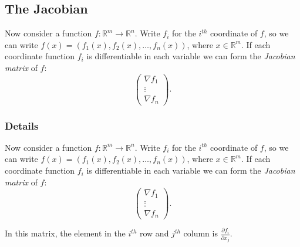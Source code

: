 \documentclass[12pt,a4paper]{article}
\theoremstyle{regla}
\theoremstyle{remark}
\theoremstyle{definition}
\theoremstyle{nonumberbreak}
\begin{document}
\subsection{The Jacobian}
\begin{fbox}
\begin{minipage}{0.97\textwidth}
Now consider a function 
$f:\mathbb{R}^m\to\mathbb{R}^n$. 
Write $f_i$ for the $i^{th}$ coordinate of $f$, so we can write $f(x)=(f_1(x),f_2(x),\ldots,f_n(x))$, 
where $x\in\mathbb{R}^m$. 
If each coordinate function $f_i$ is differentiable in each variable we can form the {\em Jacobian matrix} of $f$: 
$$\begin{pmatrix}\nabla f_1\\ 
  \vdots\\ 
  \nabla f_n
\end{pmatrix}.$$

\end{minipage}
\end{fbox}
\subsubsection{Details}
Now consider a function 
$f:\mathbb{R}^m\to\mathbb{R}^n$. 
Write $f_i$ for the $i^{th}$ coordinate of $f$, so we can write $f(x)=(f_1(x),f_2(x),\ldots,f_n(x))$, 
where $x\in\mathbb{R}^m$. 
If each coordinate function $f_i$ is differentiable in each variable we can form the {\em Jacobian matrix} of $f$: 
$$\begin{pmatrix}\nabla f_1\\ 
  \vdots\\ 
  \nabla f_n
\end{pmatrix}.$$


In this matrix, the element in the $i^{th}$ row and $j^{th}$ column is $\frac{\partial f_i}{\partial x_j}$.
\end{document}
